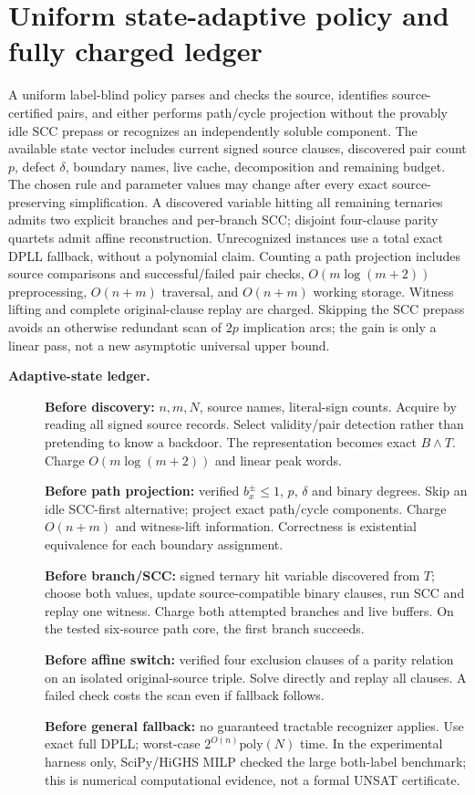 \documentclass[11pt]{article}
\begin{document}
\section{Uniform state-adaptive policy and fully charged ledger}
A uniform label-blind policy parses and checks the source, identifies source-certified pairs, and either performs path/cycle projection without the provably idle SCC prepass or recognizes an independently soluble component. The available state vector includes current signed source clauses, discovered pair count $p$, defect $\delta$, boundary names, live cache, decomposition and remaining budget. The chosen rule and parameter values may change after every exact source-preserving simplification. A discovered variable hitting all remaining ternaries admits two explicit branches and per-branch SCC; disjoint four-clause parity quartets admit affine reconstruction. Unrecognized instances use a total exact DPLL fallback, without a polynomial claim. Counting a path projection includes source comparisons and successful/failed pair checks, $O(m\log(m+2))$ preprocessing, $O(n+m)$ traversal, and $O(n+m)$ working storage. Witness lifting and complete original-clause replay are charged. Skipping the SCC prepass avoids an otherwise redundant scan of $2p$ implication arcs; the gain is only a linear pass, not a new asymptotic universal upper bound.

\noindent\textbf{Adaptive-state ledger.}
\begin{description}
\item[] \textbf{Before discovery:} $n,m,N$, source names, literal-sign counts. Acquire by reading all signed source records. Select validity/pair detection rather than pretending to know a backdoor. The representation becomes exact $B\land T$. Charge $O(m\log(m+2))$ and linear peak words.
\item[] \textbf{Before path projection:} verified $b_x^\pm\le1$, $p$, $\delta$ and binary degrees. Skip an idle SCC-first alternative; project exact path/cycle components. Charge $O(n+m)$ and witness-lift information. Correctness is existential equivalence for each boundary assignment.
\item[] \textbf{Before branch/SCC:} signed ternary hit variable discovered from $T$; choose both values, update source-compatible binary clauses, run SCC and replay one witness. Charge both attempted branches and live buffers. On the tested six-source path core, the first branch succeeds.
\item[] \textbf{Before affine switch:} verified four exclusion clauses of a parity relation on an isolated original-source triple. Solve directly and replay all clauses. A failed check costs the scan even if fallback follows.
\item[] \textbf{Before general fallback:} no guaranteed tractable recognizer applies. Use exact full DPLL; worst-case $2^{O(n)}\mathrm{poly}(N)$ time. In the experimental harness only, SciPy/HiGHS MILP checked the large both-label benchmark; this is numerical computational evidence, not a formal UNSAT certificate.
\end{description}
\end{document}
